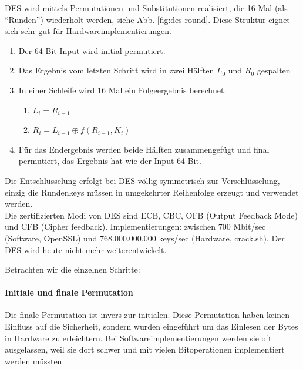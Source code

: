 DES wird mittels Permutationen und Substitutionen realisiert, die 16 Mal (als ``Runden'') wiederholt werden, siehe Abb. \ref{fig:des-round}. Diese Struktur eignet sich 
sehr gut für Hardwareimplementierungen.

\begin{enumerate}
    \item Der 64-Bit Input wird initial permutiert.
    \item Das Ergebnis vom letzten Schritt wird in zwei Hälften $L_0$ und $R_0$ gespalten
    \item In einer Schleife wird 16 Mal ein Folgeergebnis berechnet: 
    \begin{enumerate}
        \item $L_i = R_{i-1}$
        \item $R_i = L_{i-1} \oplus f(R_{i-1}, K_i)$
    \end{enumerate}
    \item Für das Endergebnis werden beide Hälften zusammengefügt und final permutiert, das Ergebnis hat wie der Input 64 Bit.
\end{enumerate}

Die Entschlüsselung erfolgt bei DES völlig symmetrisch zur Verschlüsselung, einzig die Rundenkeys müssen in umgekehrter Reihenfolge erzeugt und verwendet werden. \\

Die zertifizierten Modi von DES sind ECB, CBC, OFB (Output Feedback Mode) und CFB (Cipher feedback). Implementierungen: zwischen 700 Mbit/sec (Software, OpenSSL) und 
768.000.000.000 keys/sec (Hardware, crack.sh). Der DES wird heute nicht mehr weiterentwickelt.

Betrachten wir die einzelnen Schritte:

\paragraph{Initiale und finale Permutation}

Die finale Permutation ist invers zur initialen.
Diese Permutation haben keinen Einfluss auf die Sicherheit, sondern wurden eingeführt um das Einlesen der Bytes in Hardware zu erleichtern. Bei Softwareimplementierungen 
werden sie oft ausgelassen, weil sie dort schwer und mit vielen Bitoperationen implementiert werden müssten.

